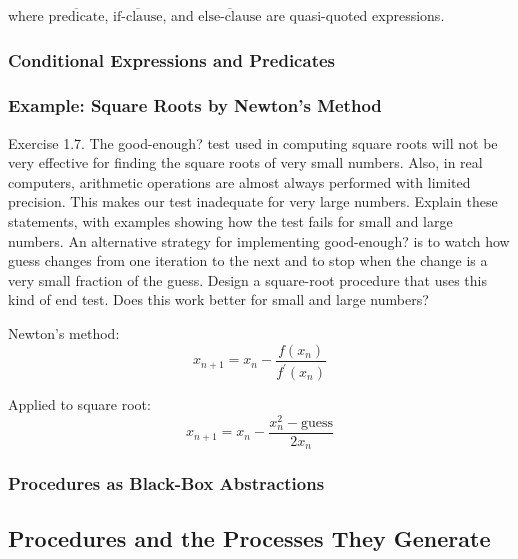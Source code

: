 where $\overline{\mbox{predicate}}$, $\overline{\mbox{if-clause}}$, and $\overline{\mbox{else-clause}}$ are quasi-quoted expressions.
\newline

            \subsubsection{Conditional Expressions and Predicates}
            \subsubsection{Example: Square Roots by Newton's Method}
Exercise 1.7. The good-enough? test used in computing square roots will not be very effective for finding the square roots of very small numbers. Also, in real computers, arithmetic operations are almost always performed with limited precision. This makes our test inadequate for very large numbers. Explain these statements, with examples showing how the test fails for small and large numbers. An alternative strategy for implementing good-enough? is to watch how guess changes from one iteration to the next and to stop when the change is a very small fraction of the guess. Design a square-root procedure that uses this kind of end test. Does this work better for small and large numbers?
\newline

Newton's method:
\begin{equation}
x_{n+1} = x_{n} - \frac{f\left(x_n\right)}{f^{'}\left(x_n\right)}
\label{eq:newtons}
\end{equation}

Applied to square root:
\begin{equation}
x_{n+1} 
= x_{n} - \frac{x^2_n - \mbox{guess}}{2 x_n}
\label{eq:newtons_sqrt}
\end{equation}

            \subsubsection{Procedures as Black-Box Abstractions}
        \subsection{Procedures and the Processes They Generate}
